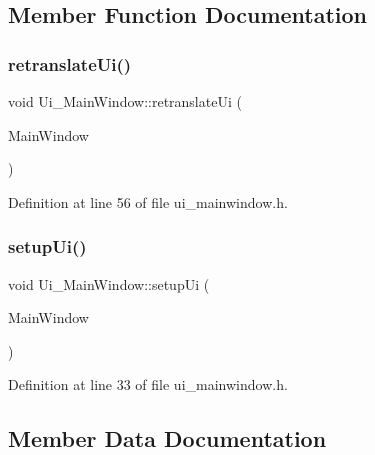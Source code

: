\subsection{Member Function Documentation}
\mbox{\label{class_ui___main_window_a097dd160c3534a204904cb374412c618}} 
\subsubsection{retranslate\+Ui()}
{\footnotesize\ttfamily void Ui\+\_\+\+Main\+Window\+::retranslate\+Ui (\begin{DoxyParamCaption}\item[{Q\+Main\+Window $\ast$}]{Main\+Window }\end{DoxyParamCaption})\hspace{0.3cm}{\ttfamily [inline]}}



Definition at line 56 of file ui\+\_\+mainwindow.\+h.

\mbox{\label{class_ui___main_window_acf4a0872c4c77d8f43a2ec66ed849b58}} 
\subsubsection{setup\+Ui()}
{\footnotesize\ttfamily void Ui\+\_\+\+Main\+Window\+::setup\+Ui (\begin{DoxyParamCaption}\item[{Q\+Main\+Window $\ast$}]{Main\+Window }\end{DoxyParamCaption})\hspace{0.3cm}{\ttfamily [inline]}}



Definition at line 33 of file ui\+\_\+mainwindow.\+h.



\subsection{Member Data Documentation}
\mbox{\label{class_ui___main_window_a30075506c2116c3ed4ff25e07ae75f81}} 
